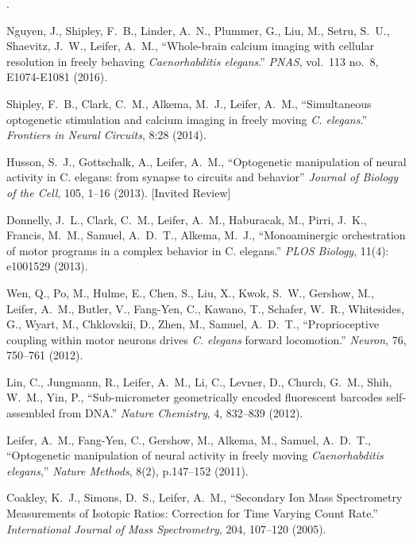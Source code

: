 \documentclass[11pt]{article}
\makeatletter
\newlength{\bibhang}
\newlength{\bibsep}
\newcounter{Lcount}
 {\@listi \global\bibsep\itemsep \global\advance\bibsep by\parsep}
\newenvironment{bibsection}%
        {\begin{list}{\arabic{Lcount}.}{%
       \usecounter{Lcount}%
       \setlength\labelwidth{-0.5em}%
       \setlength{\leftmargin}{\bibhang}%
       \setlength{\itemindent}{-\leftmargin}%
       \setlength{\itemsep}{.2\baselineskip}%
       \setlength{\parsep}{\z@}%
        \setlength{\partopsep}{0pt}%
        \setlength{\topsep}{0pt}}}
        {\end{list}\vspace{-.9\baselineskip}}
\makeatother
\begin{document}
\begin{bibsection}
\item Nguyen, J., Shipley, F.~B., Linder, A.~N., Plummer, G., Liu, M., Setru, S.~U., Shaevitz, J.~W., Leifer, A.~M., ``Whole-brain calcium imaging with cellular resolution in freely behaving \textit{Caenorhabditis elegans}.'' \emph{PNAS}, vol.~113 no.~8, E1074-E1081 (2016).

\item Shipley, F.~B., Clark, C.~M., Alkema, M.~J., Leifer, A.~M., ``Simultaneous optogenetic stimulation and calcium imaging in freely moving \textit{C. elegans}.'' \emph{Frontiers in Neural Circuits}, 8:28 (2014).

\item Husson, S.~J., Gottschalk, A., Leifer, A.~M., ``Optogenetic manipulation of neural activity in C. elegans: from synapse to circuits and behavior'' \emph{Journal of Biology of the Cell}, 105, 1--16 (2013). [Invited Review]

\item Donnelly, J.~L., Clark, C.~M., Leifer, A.~M., Haburacak, M., Pirri, J.~K., Francis, M.~M., Samuel, A.~D.~T., Alkema, M.~J., ``Monoaminergic orchestration of motor programs in a complex behavior in C. elegans.'' \emph{PLOS Biology}, 11(4): e1001529 (2013).	

\item Wen, Q., Po, M., Hulme, E., Chen, S., Liu, X., Kwok, S.~W., Gershow, M., Leifer, A.~M., Butler, V., Fang-Yen, C., Kawano, T., Schafer, W.~R., Whitesides, G., Wyart, M., Chklovskii, D., Zhen, M., Samuel, A.~D.~T., ``Proprioceptive coupling within motor neurons drives \emph{C. elegans} forward locomotion.'' \emph{Neuron}, 76, 750--761 (2012).

\item Lin, C., Jungmann, R., Leifer, A.~M., Li, C., Levner, D., Church, G.~M., Shih, W.~M., Yin, P., ``Sub-micrometer geometrically encoded fluorescent barcodes self-assembled from DNA.'' \emph{Nature Chemistry}, 4, 832--839 (2012).

\item Leifer, A.~M., Fang-Yen, C., Gershow, M., Alkema, M., Samuel, A.~D.~T., ``Optogenetic manipulation of neural activity in freely moving \emph{Caenorhabditis elegans},'' \emph{Nature Methods}, 8(2), p.147–152 (2011).

\item Coakley, K.~J., Simons, D.~S., Leifer, A.~M., ``Secondary Ion Mass Spectrometry Measurements of Isotopic Ratios: Correction for Time Varying Count Rate.'' \emph{International Journal of Mass Spectrometry}, 204, 107--120 (2005).
\end{bibsection}
\end{document}
